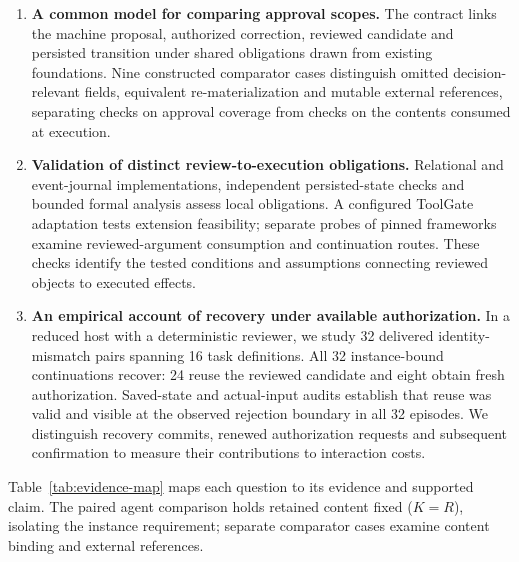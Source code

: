 \documentclass[pdflatex,sn-basic]{sn-jnl}
\begin{document}
\begin{enumerate}
\item \textbf{A common model for comparing approval scopes.} The contract links the machine proposal, authorized correction, reviewed candidate and persisted transition under shared obligations drawn from existing foundations. Nine constructed comparator cases distinguish omitted decision-relevant fields, equivalent re-materialization and mutable external references, separating checks on approval coverage from checks on the contents consumed at execution.
\item \textbf{Validation of distinct review-to-execution obligations.} Relational and event-journal implementations, independent persisted-state checks and bounded formal analysis assess local obligations. A configured ToolGate adaptation tests extension feasibility; separate probes of pinned frameworks examine reviewed-argument consumption and continuation routes. These checks identify the tested conditions and assumptions connecting reviewed objects to executed effects.
\item \textbf{An empirical account of recovery under available authorization.} In a reduced host with a deterministic reviewer, we study 32 delivered identity-mismatch pairs spanning 16 task definitions. All 32 instance-bound continuations recover: 24 reuse the reviewed candidate and eight obtain fresh authorization. Saved-state and actual-input audits establish that reuse was valid and visible at the observed rejection boundary in all 32 episodes. We distinguish recovery commits, renewed authorization requests and subsequent confirmation to measure their contributions to interaction costs.
\end{enumerate}

Table~\ref{tab:evidence-map} maps each question to its evidence and supported claim. The paired agent comparison holds retained content fixed ($K=R$), isolating the instance requirement; separate comparator cases examine content binding and external references.
\end{document}
